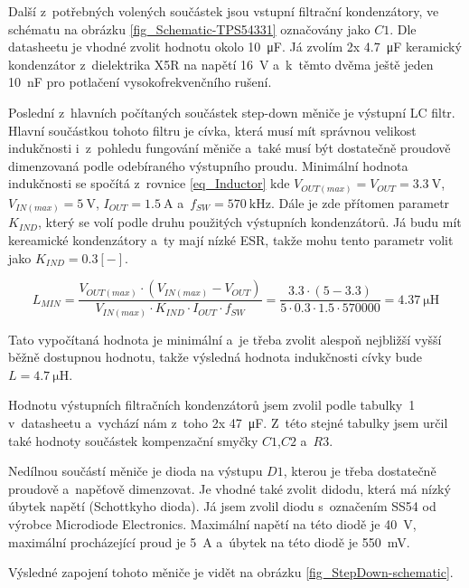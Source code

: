 Další z~potřebných volených součástek jsou vstupní filtrační kondenzátory, ve schématu na obrázku \ref{fig_Schematic-TPS54331} označovány jako $C1$. Dle datasheetu je vhodné zvolit hodnotu okolo \SI{10}{\micro\farad}. Já zvolím 2x \SI{4,7}{\micro\farad} keramický kondenzátor z~dielektrika X5R na napětí \SI{16}{\volt} a~k~těmto dvěma ještě jeden \SI{10}{\nano\farad} pro potlačení vysokofrekvenčního rušení.

Poslední z~hlavních počítaných součástek step-down měniče je výstupní LC filtr. Hlavní součástkou tohoto filtru je cívka, která musí mít správnou velikost indukčnosti i~z~pohledu fungování měniče a~také musí být dostatečně proudově dimenzovaná podle odebíraného výstupního proudu. Minimální hodnota indukčnosti se spočítá z~rovnice \ref{eq_Inductor} kde $V_{OUT(max)}=V_{OUT}=\SI{3,3}{\volt}$, $V_{IN(max)}=\SI{5}{\volt}$, $I_{OUT}=\SI{1,5}{\ampere}$ a~$f_{SW}=\SI{570}{\kilo\hertz}$. Dále je zde přítomen parametr $K_{IND}$, který se volí podle druhu použitých výstupních kondenzátorů. Já budu mít kereamické kondenzátory a~ty mají nízké ESR, takže mohu tento parametr volit jako $K_{IND}=0.3[-]$.

\begin{equation}
    L_{MIN}=\frac{V_{OUT(max)}\cdot (V_{IN(max)}-V_{OUT})}{V_{IN(max)}\cdot K_{IND}\cdot I_{OUT}\cdot f_{SW}}=\frac{3.3\cdot (5-3.3)}{5\cdot 0.3\cdot 1.5 \cdot 570000}=\SI{4,37}{\micro\henry}
    \label{eq_Inductor}
\end{equation}

Tato vypočítaná hodnota je minimální a~je třeba zvolit alespoň nejbližší vyšší běžně dostupnou hodnotu, takže výsledná hodnota indukčnosti cívky bude $L=\SI{4,7}{\micro\henry}$. 

Hodnotu výstupních filtračních kondenzátorů jsem zvolil podle tabulky~1 v~datasheetu \cite{dat_TPS54331} a~vychází nám z~toho 2x \SI{47}{\micro\farad}. Z~této stejné tabulky jsem určil také hodnoty součástek kompenzační smyčky $C1$,$C2$ a~$R3$.

Nedílnou součástí měniče je dioda na výstupu $D1$, kterou je třeba dostatečně proudově a~napěťově dimenzovat. Je vhodné také zvolit didodu, která má nízký úbytek napětí (Schottkyho dioda). Já jsem zvolil diodu s~označením SS54 od výrobce Microdiode Electronics. Maximální napětí na této diodě je \SI{40}{\volt}, maximální procházející proud je \SI{5}{\ampere} a~úbytek na této diodě je \SI{550}{\milli\volt}.

Výsledné zapojení tohoto měniče je vidět na obrázku \ref{fig_StepDown-schematic}.

